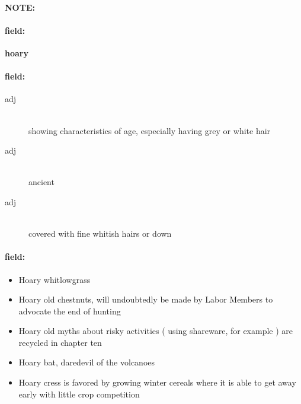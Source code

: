 \documentclass[12pt]{article}
\newenvironment{note}{\paragraph{NOTE:}}{}
\newenvironment{field}{\paragraph{field:}}{}
\begin{document}
\begin{note}
\begin{field}
\textbf{\large hoary}
\end{field}


\begin{field}
\begin{description}
\item[adj] \hfill \\ 
showing characteristics of age, especially having grey or white hair

\item[adj] \hfill \\ 
ancient

\item[adj] \hfill \\ 
covered with fine whitish hairs or down

\end{description}
\end{field}

\begin{field}
\begin{itemize}
\item Hoary whitlowgrass
\item Hoary old chestnuts, will undoubtedly be made by Labor Members to advocate the end of hunting
\item Hoary old myths about risky activities ( using shareware, for example ) are recycled in chapter ten
\item Hoary bat, daredevil of the volcanoes
\item Hoary cress is favored by growing winter cereals where it is able to get away early with little crop competition
\end{itemize}
\end{field}
\end{note}
\end{document}
